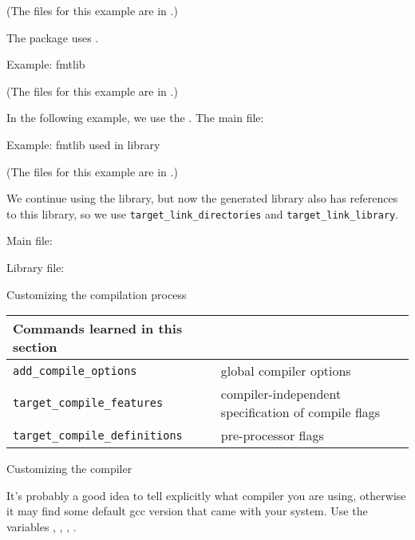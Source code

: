 (The files for this example are in .)

The  package uses .




 {Example: fmtlib}

(The files for this example are in .)

In the following example, we use the .
The main  file:
%


 {Example: fmtlib used in library}

(The files for this example are in .)

We continue using the  library,
but now the generated library also has references to this library,
so we use \lstinline+target_link_directories+ and \lstinline+target_link_library+.

Main file:
%


Library file:
%



 {Customizing the compilation process}

\begin{tabular}{lp{3in}}
  \toprule
  Commands learned in this section\\
  \midrule
  \lstinline+add_compile_options+&global compiler options\\
  \lstinline+target_compile_features+&compiler-independent specification of compile flags\\
  \lstinline+target_compile_definitions+&pre-processor flags\\
  \bottomrule
\end{tabular}

 {Customizing the compiler}

It's probably a good idea to tell  explicitly what compiler you are using,
otherwise it may find some default gcc version that came with your system.
Use the variables , ,
,
.

